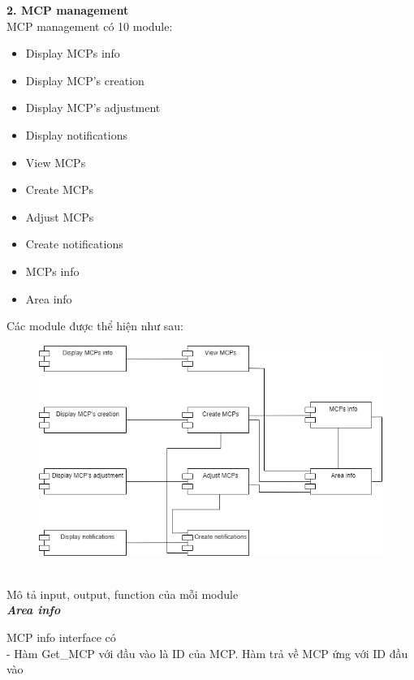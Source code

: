 \documentclass[a4paper]{article}
\begin{document}
\begin{itemize}
\newline
\newline
\newline
\textbf{    2. MCP management } \\
    MCP management có 10 module:
    \begin{itemize}
        \item Display MCPs info
        \item Display MCP's creation
        \item Display MCP's adjustment
        \item Display notifications
        \item View MCPs
        \item Create MCPs
        \item Adjust MCPs
        \item Create notifications
        \item MCPs info
        \item Area info
    \end{itemize}
    Các module được thể hiện như sau:\\
    \begin{figure}[!h]
    \begin{center}
      \includegraphics[width=6in]{Image/MCP_mn_md.png}
    \end{center}
\end{figure} \\
    Mô tả input, output, function của mỗi module\\
\textbf{    \textit{Area info} } \\
\begin{minipage}[b]{0.4\textwidth}
MCP info interface có \\
- Hàm Get\_MCP với đầu vào là ID của MCP. Hàm trả về MCP ứng với ID đầu vào

\end{minipage}
\end{itemize}
\end{document}
